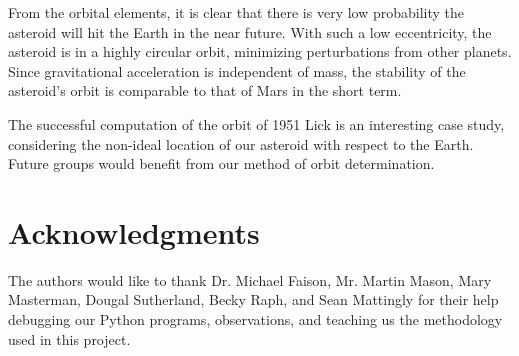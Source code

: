 \documentclass[11pt,a4paper]{article}
\begin{document}
From the orbital elements, it is clear that there is very low probability the asteroid will hit the Earth in the near future.
With such a low eccentricity, the asteroid is in a highly circular orbit, minimizing perturbations from other planets.
Since gravitational acceleration is independent of mass, the stability of the asteroid's orbit is comparable to that of Mars in the short term.

The successful computation of the orbit of 1951 Lick is an interesting case study, considering the non-ideal location of our asteroid with respect to the Earth.
Future groups would benefit from our method of orbit determination.

\section*{Acknowledgments}

The authors would like to thank Dr. Michael Faison, Mr. Martin Mason, Mary Masterman, Dougal Sutherland, Becky Raph, and Sean Mattingly for their help debugging our Python programs, observations, and teaching us the methodology used in this project.

\end{document}
